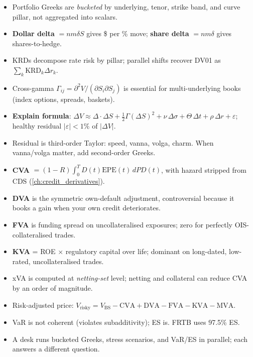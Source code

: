 \begin{itemize}
  \item Portfolio Greeks are \emph{bucketed} by underlying, tenor,
    strike band, and curve pillar, not aggregated into scalars.
  \item \textbf{Dollar delta} $= n m \delta S$ gives \$ per \% move;
    \textbf{share delta} $= n m \delta$ gives shares-to-hedge.
  \item KRDs decompose rate risk by pillar; parallel shifts recover
    DV01 as $\sum_k \mathrm{KRD}_k \Delta r_k$.
  \item Cross-gamma $\Gamma_{ij} = \partial^2 V /(\partial S_i
    \partial S_j)$ is essential for multi-underlying books (index
    options, spreads, baskets).
  \item \textbf{Explain formula}: $\Delta V \approx \Delta \cdot
    \Delta S + \tfrac12 \Gamma (\Delta S)^2 + \nu\, \Delta\sigma +
    \Theta\, \Delta t + \rho\, \Delta r + \varepsilon$; healthy
    residual $|\varepsilon| < 1\%$ of $|\Delta V|$.
  \item Residual is third-order Taylor: speed, vanna, volga, charm.
    When vanna/volga matter, add second-order Greeks.
  \item \textbf{CVA} $= (1-R) \int_0^T D(t) \mathrm{EPE}(t)\, dPD(t)$,
    with hazard stripped from CDS (\cref{ch:credit_derivatives}).
  \item \textbf{DVA} is the symmetric own-default adjustment,
    controversial because it books a gain when your own credit
    deteriorates.
  \item \textbf{FVA} is funding spread on uncollateralised exposures;
    zero for perfectly OIS-collateralised trades.
  \item \textbf{KVA} = ROE $\times$ regulatory capital over life;
    dominant on long-dated, low-rated, uncollateralised trades.
  \item xVA is computed at \emph{netting-set} level; netting and
    collateral can reduce CVA by an order of magnitude.
  \item Risk-adjusted price: $V_{\mathrm{risky}} = V_{\mathrm{BS}}
    - \mathrm{CVA} + \mathrm{DVA} - \mathrm{FVA} - \mathrm{KVA}
    - \mathrm{MVA}$.
  \item VaR is not coherent (violates subadditivity); ES is.  FRTB
    uses 97.5\% ES.
  \item A desk runs bucketed Greeks, stress scenarios, and VaR/ES
    in parallel; each answers a different question.
\end{itemize}


